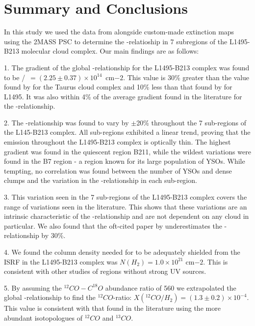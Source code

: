 \documentclass{aa}
\begin{document}
\section{Summary and Conclusions}

In this study we used the \eco data from \citet{hacar13} alongside custom-made extinction maps using the 2MASS PSC to determine the \eco-\htwo relatioship in 7 subregions of the L1495-B213 molecular cloud complex. Our main findings are as follows:

1. The gradient of the global \neco-\av relationship for the L1495-B213 complex was found to be \neco/\av~$=(2.25\pm0.37) \times 10^{14}$~cm$-2$. This value is  30\% greater than the value found by \citet{frerking82} for the Taurus cloud complex and 10\% less than that found by \citet{duvert86} for L1495. It was also within 4\% of the average gradient found in the literature for the \neco-\av relationship. 

2. The \neco-\av relationship was found to vary by $\pm$20\% throughout the 7 sub-regions of the L145-B213 complex.  All sub-regions exhibited a linear trend, proving that the \eco emission throughout the L1495-B213 complex is optically thin. The highest gradient was found in the quiescent region B211, while the wildest variations were found in the B7 region - a region known for its large population of YSOs. While tempting, no correlation was found between the number of YSOs and dense clumps and the variation in the \neco-\av relationship in each sub-region.

3. This variation seen in the 7 sub-regions of the L1495-B213 complex covers the range of variations seen in the literature. This shows that these variations are an intrinsic characteristic of the \neco-\av relationship and are not dependent on any cloud in particular. We also found that the oft-cited paper by \citet{frerking82} underestimates the \neco-\av relationship by 30\%.

4. We found the \htwo column density needed for \eco to be adequately shielded from the ISRF in the L1495-B213 complex was $N(H_2)=1.0 \times 10^{21}$ cm$-2$. This is consistent with other studies of regions without strong UV sources.

5. By assuming the $^{12}CO-C^{18}O$ abundance ratio of 560 \citep{wilson94} we extrapolated the global \neco-\av relationship to find the $^{12}CO$-\htwo ratio: $X(^{12}CO/H_2)=(1 .3\pm0.2)\times10^{-4}$. This value is consistent with that found in the literature using the more abundant isotopologues of $^{12}CO$ and $^{13}CO$. 
\end{document}
